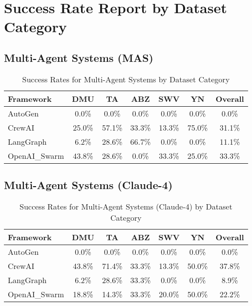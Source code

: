 \documentclass{article}
\begin{document}
\section*{Success Rate Report by Dataset Category}

\subsection*{Multi-Agent Systems (MAS)}
\begin{longtable}{|l|c|c|c|c|c|c|}
\caption{Success Rates for Multi-Agent Systems by Dataset Category} \\
\toprule
\textbf{Framework} & \textbf{DMU} & \textbf{TA} & \textbf{ABZ} & \textbf{SWV} & \textbf{YN} & \textbf{Overall} \\
\midrule
\endhead
AutoGen & 0.0\% & 0.0\% & 0.0\% & 0.0\% & 0.0\% & 0.0\% \\
CrewAI & 25.0\% & 57.1\% & 33.3\% & 13.3\% & 75.0\% & 31.1\% \\
LangGraph & 6.2\% & 28.6\% & 66.7\% & 0.0\% & 0.0\% & 11.1\% \\
OpenAI_Swarm & 43.8\% & 28.6\% & 0.0\% & 33.3\% & 25.0\% & 33.3\% \\
\bottomrule
\end{longtable}

\subsection*{Multi-Agent Systems (Claude-4)}
\begin{longtable}{|l|c|c|c|c|c|c|}
\caption{Success Rates for Multi-Agent Systems (Claude-4) by Dataset Category} \\
\toprule
\textbf{Framework} & \textbf{DMU} & \textbf{TA} & \textbf{ABZ} & \textbf{SWV} & \textbf{YN} & \textbf{Overall} \\
\midrule
\endhead
AutoGen & 0.0\% & 0.0\% & 0.0\% & 0.0\% & 0.0\% & 0.0\% \\
CrewAI & 43.8\% & 71.4\% & 33.3\% & 13.3\% & 50.0\% & 37.8\% \\
LangGraph & 6.2\% & 28.6\% & 33.3\% & 0.0\% & 0.0\% & 8.9\% \\
OpenAI_Swarm & 18.8\% & 14.3\% & 33.3\% & 20.0\% & 50.0\% & 22.2\% \\
\bottomrule
\end{longtable}
\end{document}
